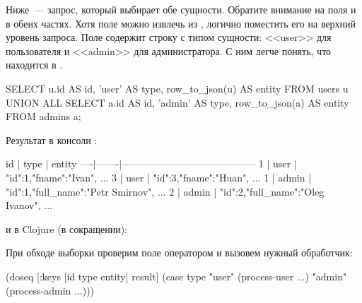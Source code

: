 
Ниже~--- запрос, который выбирает обе сущности. Обратите внимание на поля  и  в обеих частях. Хотя поле  можно извлечь из , логично поместить его на верхний уровень запроса. Поле  содержит строку с типом сущности: <<user>> для пользователя и <<admin>> для администратора. С ним легче понять, что находится в .

\begin{english}
  \begin{sql}
SELECT
  u.id AS id,
  'user' AS type,
  row_to_json(u) AS entity
FROM
  users u
UNION ALL
SELECT
  a.id AS id,
  'admin' AS type,
  row_to_json(a) AS entity
FROM
  admins a;
  \end{sql}
\end{english}

Результат в консоли :

\begin{english}
  \begin{text}
 id | type  |                 entity
----|-------|-----------------------------------------
  1 | user  | {"id":1,"fname":"Ivan", ...}
  3 | user  | {"id":3,"fname":"Huan", ...}
  1 | admin | {"id":1,"full_name":"Petr Smirnov", ...}
  2 | admin | {"id":2,"full_name":"Oleg Ivanov", ...}
  \end{text}
\end{english}

\noindent
и в Clojure (в сокращении):

\begin{english}
  \begin{clojure}
  \end{clojure}
\end{english}

При обходе выборки проверим поле  оператором  и вызовем нужный обработчик:

\begin{english}
  \begin{clojure}
(doseq [{:keys [id type entity]} result]
  (case type
    "user" (process-user ...)
    "admin" (process-admin ...)))
  \end{clojure}
\end{english}

